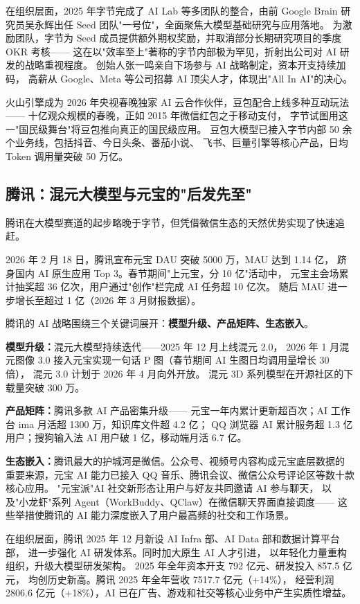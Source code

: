 在组织层面，2025 年字节完成了 AI Lab 等多团队的整合，由前 Google Brain
研究员吴永辉出任 Seed 团队"一号位"，全面聚焦大模型基础研究与应用落地。
为激励团队，字节为 Seed 成员提供额外期权奖励，并取消部分长期研究项目的季度 OKR 考核——
这在以"效率至上"著称的字节内部极为罕见，折射出公司对 AI 研发的战略重视程度。
创始人张一鸣亲自下场参与 AI 战略制定，资本开支持续加码，
高薪从 Google、Meta 等公司招募 AI 顶尖人才，体现出"All In AI"的决心。

火山引擎成为 2026 年央视春晚独家 AI 云合作伙伴，豆包配合上线多种互动玩法——
十亿观众规模的春晚，正如 2015 年微信红包之于移动支付，
字节试图用这一"国民级舞台"将豆包推向真正的国民级应用。
豆包大模型已接入字节内部 50 余个业务线，包括抖音、今日头条、番茄小说、
飞书、巨量引擎等核心产品，日均 Token 调用量突破 50 万亿。

\subsection{腾讯：混元大模型与元宝的"后发先至"}
\label{subsec:china-tencent}

腾讯在大模型赛道的起步略晚于字节，但凭借微信生态的天然优势实现了快速追赶。

2026 年 2 月 18 日，腾讯宣布元宝 DAU 突破 5000 万，MAU 达到 1.14 亿，
跻身国内 AI 原生应用 Top 3。春节期间"上元宝，分 10 亿"活动中，
元宝主会场累计抽奖超 36 亿次，用户通过"创作"栏完成 AI 任务超 10 亿次。
随后 MAU 进一步增长至超过 1 亿（2026 年 3 月财报数据）。

腾讯的 AI 战略围绕三个关键词展开：\textbf{模型升级、产品矩阵、生态嵌入}。

\textbf{模型升级：}混元大模型持续迭代——2025 年 12 月上线混元 2.0，
2026 年 1 月混元图像 3.0 接入元宝实现一句话 P 图（春节期间 AI 生图日均调用量增长 30 倍），
混元 3.0 计划于 2026 年 4 月向外开放。
混元 3D 系列模型在开源社区的下载量突破 300 万。

\textbf{产品矩阵：}腾讯多款 AI 产品密集升级——
元宝一年内累计更新超百次；AI 工作台 ima 月活超 1300 万，知识库文件超 4.2 亿；
QQ 浏览器 AI 累计服务超 1.3 亿用户；搜狗输入法 AI 用户破 1 亿，移动端月活 6.7 亿。

\textbf{生态嵌入：}腾讯最大的护城河是微信。公众号、视频号内容构成元宝底层数据的
重要来源，元宝 AI 能力已接入 QQ 音乐、腾讯会议、微信公众号评论区等数十款核心应用。
"元宝派"AI 社交新形态让用户与好友共同邀请 AI 参与聊天，
以及"小龙虾"系列 Agent（WorkBuddy、QClaw）在微信聊天界面直接调度——
这些举措使腾讯的 AI 能力深度嵌入了用户最高频的社交和工作场景。

在组织层面，腾讯 2025 年 12 月新设 AI Infra 部、AI Data 部和数据计算平台部，
进一步强化 AI 研发体系。同时加大原生 AI 人才引进，
以年轻化力量重构组织，升级大模型研发架构。
2025 年全年资本开支 792 亿元、研发投入 857.5 亿元，
均创历史新高。腾讯 2025 年全年营收 7517.7 亿元（+14\%），
经营利润 2806.6 亿元（+18\%），AI 已在广告、游戏和社交等核心业务中产生实质性增益。

